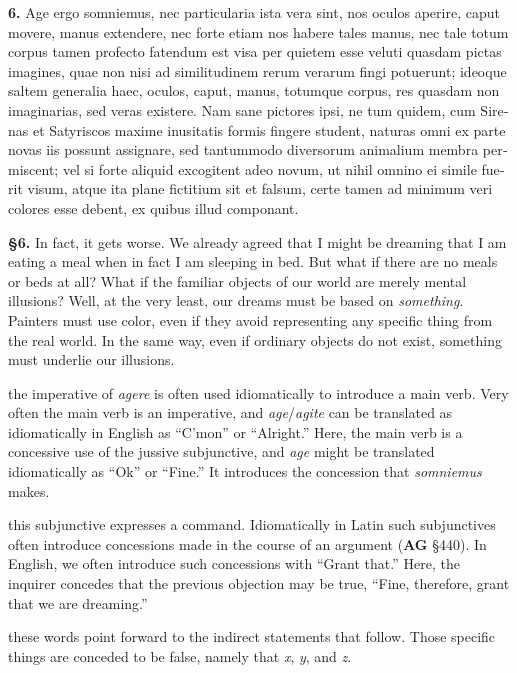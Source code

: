 \beginnumbering
\pstart
\begin{latin}
\textenglish{\textbf{6.}} Age ergo somniemus, nec particularia ista vera sint, nos oculos aperire, caput movere, manus extendere, nec forte etiam nos habere tales manus, nec tale totum corpus tamen profecto fatendum est visa per quietem esse veluti quasdam pictas imagines, quae non nisi ad similitudinem rerum verarum fingi potuerunt; ideoque saltem generalia haec, oculos, caput, manus, totumque corpus, res quasdam non imaginarias, sed veras existere. Nam sane pictores ipsi, ne tum quidem, cum Sirenas et Satyriscos maxime inusitatis formis fingere student, naturas omni ex parte novas iis possunt assignare, sed tantummodo diversorum animalium membra permiscent; vel si forte aliquid excogitent adeo novum, ut nihil omnino ei simile fuerit visum, atque ita plane fictitium sit et falsum, certe tamen ad minimum veri colores esse debent, ex quibus illud componant.
\end{latin}
\pend
\endnumbering

\prenotes

\textbf{§6.} In fact, it gets worse. We already agreed that I might be dreaming that I am eating a meal when in fact I am sleeping in bed. But what if there are no meals or beds at all? What if the familiar objects of our world are merely mental illusions? Well, at the very least, our dreams must be based on \textit{something}. Painters must use color, even if they avoid representing any specific thing from the real world. In the same way, even if ordinary objects do not exist, something must underlie our illusions.

 the imperative of \textit{agere} is often used idiomatically to introduce a main verb. Very often the main verb is an imperative, and \textit{age}/\textit{agite} can be translated as idiomatically in English as ``C'mon'' or   ``Alright.'' Here, the main verb is a concessive use of the jussive subjunctive, and \textit{age} might be translated idiomatically as ``Ok'' or ``Fine.'' It introduces the concession that \textit{somniemus} makes.

 this subjunctive expresses a command. Idiomatically in Latin such subjunctives often introduce concessions made in the course of an argument (\textbf{AG} §440). In English, we often introduce such concessions with ``Grant that.'' Here, the inquirer concedes that the previous objection may be true, ``Fine, therefore, grant that we are dreaming.''

 these words point forward to the indirect statements that follow. Those specific things are conceded to be false, namely that \textit{x}, \textit{y}, and \textit{z}.

